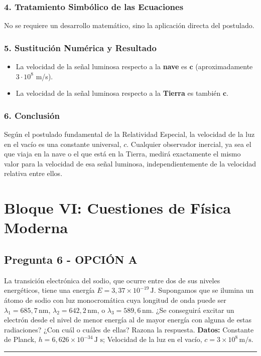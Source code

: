 \subsubsection*{4. Tratamiento Simbólico de las Ecuaciones}
No se requiere un desarrollo matemático, sino la aplicación directa del postulado.

\subsubsection*{5. Sustitución Numérica y Resultado}
\begin{cajaresultado}
\begin{itemize}
    \item La velocidad de la señal luminosa respecto a la \textbf{nave} es $\boldsymbol{c}$ (aproximadamente $3 \cdot 10^8$ m/s).
    \item La velocidad de la señal luminosa respecto a la \textbf{Tierra} es también $\boldsymbol{c}$.
\end{itemize}
\end{cajaresultado}

\subsubsection*{6. Conclusión}
\begin{cajaconclusion}
Según el postulado fundamental de la Relatividad Especial, la velocidad de la luz en el vacío es una constante universal, $c$. Cualquier observador inercial, ya sea el que viaja en la nave o el que está en la Tierra, medirá exactamente el mismo valor para la velocidad de esa señal luminosa, independientemente de la velocidad relativa entre ellos.
\end{cajaconclusion}

\newpage

\section{Bloque VI: Cuestiones de Física Moderna}
\label{sec:moderna2_2003_sep_ext}

\subsection{Pregunta 6 - OPCIÓN A}
\label{subsec:6A_2003_sep_ext}

\begin{cajaenunciado}
La transición electrónica del sodio, que ocurre entre dos de sus niveles energéticos, tiene una energía $E=3,37\times10^{-19}\,\text{J}$. Supongamos que se ilumina un átomo de sodio con luz monocromática cuya longitud de onda puede ser $\lambda_1=685,7\,\text{nm}$, $\lambda_2=642,2\,\text{nm}$, o $\lambda_3=589,6\,\text{nm}$. ¿Se conseguirá excitar un electrón desde el nivel de menor energía al de mayor energía con alguna de estas radiaciones? ¿Con cuál o cuáles de ellas? Razona la respuesta.
\textbf{Datos:} Constante de Planck, $h=6,626\times10^{-34}\,\text{J s}$; Velocidad de la luz en el vacío, $c=3\times10^8\,\text{m/s}$.
\end{cajaenunciado}
\hrule

